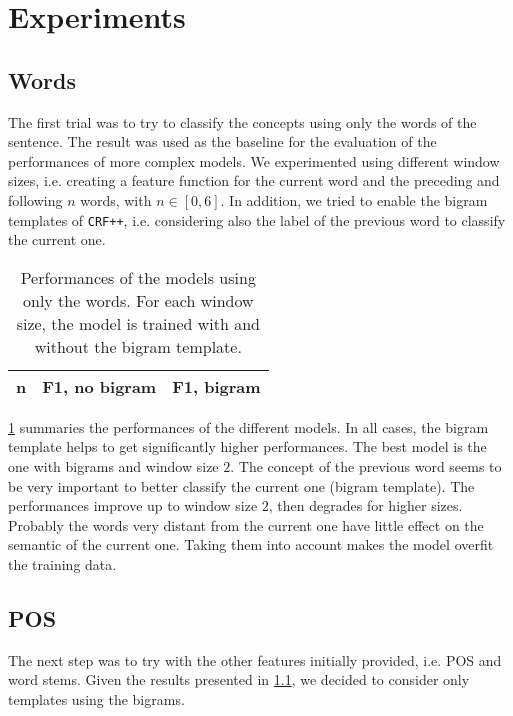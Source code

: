 \section{Experiments}
\label{sec:experiments}

\subsection{Words}
\label{subsection:words}
The first trial was to try to classify the concepts using only the words of the sentence.
The result was used as the baseline for the evaluation of the performances of more complex models.
We experimented using different window sizes, i.e. creating a feature function for the current word and the preceding and following $n$ words, with $n \in [0,6]$.
In addition, we tried to enable the bigram templates of \texttt{CRF++}, i.e. considering also the label of the previous word to classify the current one. 

\begin{table}[h]
	\centering
    \begin{tabular}{ c c c }
    	\toprule
    		\multicolumn{1}{c}{n} & \multicolumn{1}{c}{F1, no bigram} & \multicolumn{1}{c}{F1, bigram} \\
    	\midrule
            
    	\bottomrule
	\end{tabular}
    \caption{Performances of the models using only the words. For each window size, the model is trained with and without the bigram template.}
	\label{tab:words}
\end{table}

\cref{tab:words} summaries the performances of the different models.
In all cases, the bigram template helps to get significantly higher performances.
The best model is the one with bigrams and window size $2$.
The concept of the previous word seems to be very important to better classify the current one (bigram template).
The performances improve up to window size $2$, then degrades for higher sizes.
Probably the words very distant from the current one have little effect on the semantic of the current one.
Taking them into account makes the model overfit the training data.

\subsection{POS}
\label{subsection:pos}
The next step was to try with the other features initially provided, i.e. \ac{POS} and word stems.
Given the results presented in \cref{subsection:words}, we decided to consider only templates using the bigrams.

